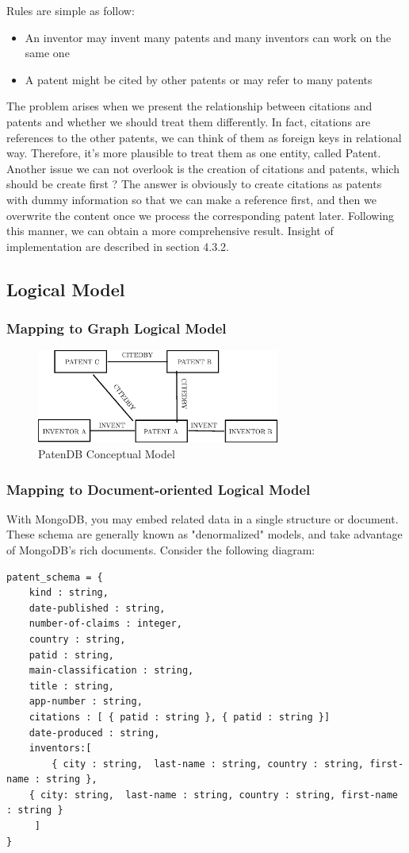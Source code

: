 \documentclass{sig-alternate}
\begin{document}
{Rules are simple as follow:

\begin{itemize}
  \item An inventor may invent many patents and many inventors can work on the same one
  \item A patent might be cited by other patents or may refer to many patents
\end{itemize}

The problem arises when we present the relationship between citations and patents and whether we should treat them differently. In fact, citations are references to the other patents, we can think of them as foreign keys in relational way. Therefore, it's more plausible to treat them as one entity, called Patent. Another issue we can not overlook is the creation of citations and patents, which should be create first ? The answer is obviously to create citations as patents with dummy information so that we can make a reference first, and then we overwrite the content once we process the corresponding patent later. Following this manner, we can obtain a more comprehensive result. Insight of implementation are described in section 4.3.2.

\subsection{Logical Model}
\subsubsection{Mapping to Graph Logical Model}

\begin{figure}[htb]
\centering
\includegraphics[width=80mm,scale=10]{neo4jgraph.eps}
\caption{ PatenDB Conceptual Model}
\end{figure}

\subsubsection{Mapping to Document-oriented Logical Model}
With MongoDB, you may embed related data in a single structure or document. These schema are generally known as "denormalized" models, and take advantage of MongoDB's rich documents. Consider the following diagram:
\begin{lstlisting}[caption=Document-oriented schema]
patent_schema = {
    kind : string, 
    date-published : string, 
    number-of-claims : integer, 
    country : string, 
    patid : string,
    main-classification : string,
    title : string,
    app-number : string, 
    citations : [ { patid : string }, { patid : string }]
    date-produced : string, 
    inventors:[
        { city : string,  last-name : string, country : string, first-name : string },
	{ city: string,  last-name : string, country : string, first-name : string }
     ]       
}


\end{lstlisting}}
\end{document}
